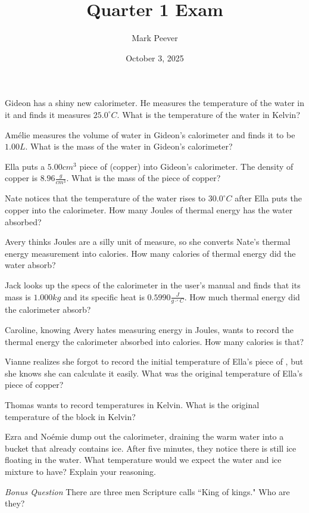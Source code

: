\documentclass[11pt,addpoints]{exam}   	%
\title{Quarter 1 Exam}
\author{Mark Peever}
\date{October 3, 2025}							%
\begin{document}
\maketitle

\pointsinrightmargin

\begin{center}
\end{center}
\vspace{0.1in}
\vspace{0.2in}

\begin{questions}
\question[5] Gideon has a shiny new calorimeter. He measures the temperature of the water in it and finds it measures  $25.0^{\circ}C$. What is the temperature of the water in Kelvin? 

\question[5] Am\'{e}lie measures the volume of water in Gideon's calorimeter and finds it to be $1.00 L$. What is the mass of the water in Gideon's calorimeter?

\question[5] Ella puts a $5.00 cm^3$ piece of  (copper) into Gideon's calorimeter.  The density of copper is $8.96 \frac{g}{cm^{3}}$. What is the mass of the piece of copper?

\question[5] Nate notices that the temperature of the water rises to $30.0^{\circ}C$ after Ella puts the copper into the calorimeter. How many Joules of thermal energy has the water absorbed?

\question[5] Avery thinks Joules are a silly unit of measure, so she converts Nate's thermal energy measurement into calories. How many calories of thermal energy did the water absorb?

\question[5] Jack looks up the specs of the calorimeter in the user's manual and finds that its mass is $1.000 kg$ and its specific heat is $0.5990 \frac{J}{g \cdot ^{\circ}C}$. 
How much thermal energy did the calorimeter absorb?

\question[5] Caroline, knowing Avery hates measuring energy in Joules, wants to record the thermal energy the calorimeter absorbed into calories. How many calories is that?

\question[5] Vianne realizes she forgot to record the initial temperature of Ella's piece of , but she knows she can calculate it easily. What was the original temperature of Ella's piece of copper?

\question[5] Thomas wants to record temperatures in Kelvin. What is the original temperature of the  block in Kelvin?

\question[5] Ezra and No\'{e}mie dump out the calorimeter, draining the warm water into a bucket that already contains ice. After five minutes, they notice there is still ice floating in the water. What temperature would we expect the water and ice mixture to have? Explain your reasoning.

\bonusquestion \emph{Bonus Question} There are three men Scripture calls ``King of kings." Who are they?

\end{questions}
\end{document}
